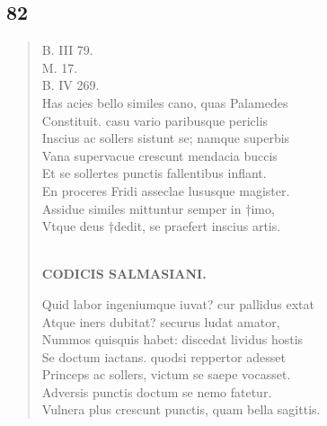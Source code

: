 \documentclass[11pt, a4paper]{report}
\begin{document}
            \subsection*{82}
      \begin{verse}
      B. III 79. \\ M. 17. \\ B. IV 269. \\ Has acies bello similes cano, quas Palamedes \\ Constituit. casu vario paribusque periclis \\ Inscius ac sollers sistunt se; namque superbis \\ Vana supervacue crescunt mendacia buccis \\ Et se sollertes punctis fallentibus inflant. \\ En proceres Fridi asseclae lususque magister. \\ Assidue similes mittuntur semper in †imo, \\ Vtque deus †dedit, se praefert inscius artis. \\ 
        ﻿\pagebreak 
    \begin{center} \textbf{CODICIS SALMASIANI.} \end{center}Quid labor ingeniumque iuvat? cur pallidus extat \\ Atque iners dubitat? securus ludat amator, \\ Nummos quisquis habet: discedat lividus hostis \\ Se doctum iactans. quodsi reppertor adesset \\ Princeps ac sollers, victum se saepe vocasset. \\ Adversis punctis doctum se nemo fatetur. \\ Vulnera plus crescunt punctis, quam bella sagittis. \\ 
      \end{verse}
  
\end{document}
